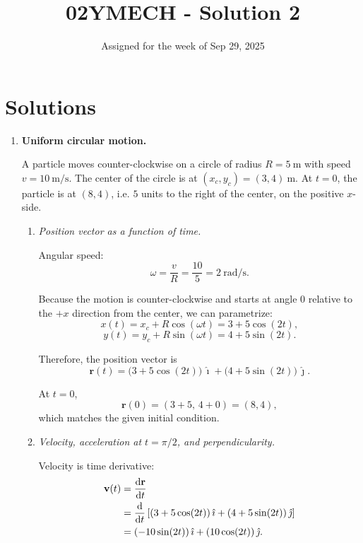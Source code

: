 \documentclass[12pt]{article}
\title{02YMECH - Solution 2}
\date{Assigned for the week of Sep 29, 2025}
\author{}
\begin{document}
\maketitle

\section*{Solutions}

\begin{enumerate}

\item \textbf{Uniform circular motion.}

A particle moves counter-clockwise on a circle of radius $R = 5~\text{m}$ with speed $v = 10~\text{m/s}$. The center of the circle is at $(x_c, y_c) = (3,4)~\text{m}$. At $t=0$, the particle is at $(8,4)$, i.e. $5$ units to the right of the center, on the positive $x$-side.

\begin{enumerate}
    \item \textit{Position vector as a function of time.}

    Angular speed:
    \[
    \omega = \frac{v}{R} = \frac{10}{5} = 2~\text{rad/s}.
    \]

    Because the motion is counter-clockwise and starts at angle $0$ relative to the $+x$ direction from the center, we can parametrize:
    \[
    x(t) = x_c + R \cos(\omega t) = 3 + 5\cos(2t),
    \]
    \[
    y(t) = y_c + R \sin(\omega t) = 4 + 5\sin(2t).
    \]

    Therefore, the position vector is
    \[
    \mathbf{r}(t)
    = \big(3 + 5\cos(2t)\big)\,\hat{\imath}
    + \big(4 + 5\sin(2t)\big)\,\hat{\jmath}.
    \]

    At $t=0$,
    \[
    \mathbf{r}(0)
    = (3+5,\,4+0)
    = (8,4),
    \]
    which matches the given initial condition.

    \item \textit{Velocity, acceleration at $t=\pi/2$, and perpendicularity.}

    Velocity is time derivative:
    \begin{align*}
    \mathbf{v}(t)
    &= \dv{\mathbf{r}}{t} \\
    &= \dv{t}\left[(3 + 5\cos(2t))\,\hat{\imath}
    + (4 + 5\sin(2t))\,\hat{\jmath}\right] \\
    &= (-10\sin(2t))\,\hat{\imath}
    + (10\cos(2t))\,\hat{\jmath}.
    \end{align*}


\end{enumerate}
\end{enumerate}
\end{document}
